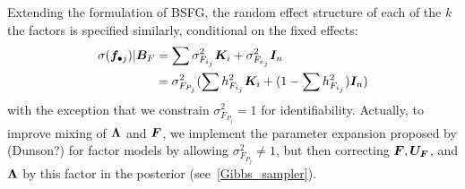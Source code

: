 \documentclass[11pt]{amsart}
\newcommand*{\B}[1]{\ifmmode\bm{#1}\else\textbf{#1}\fi}
\begin{document}
Extending the formulation of BSFG, the random effect structure of each of the $k$ the factors is specified similarly, conditional on the fixed effects:
\begin{align} \begin{split}
\sigma(\B{f}_{\bullet j} ) | \B{B}_F &= \sum \sigma^2_{F_{i_j}} \B{K}_i + \sigma^2_{F_{e_j}}\B{I}_n \\
&= \sigma^2_{F_{P_j}} (\sum h^2_{F_{i_j}} \B{K}_i + (1 - \sum h^2_{F_{i_j}})\B{I}_n) 
\end{split} \end{align}
\noindent with the exception that we constrain $\sigma^2_{F_{P_j}} = 1$ for identifiability. Actually, to improve mixing of $\B{\Lambda}$ and $\B{F}$, we implement the parameter expansion proposed by (Dunson?) for factor models by allowing $\sigma^2_{F_{P_j}} \neq1$, but then correcting $\B{F}, \B{U_F}$, and $\B{\Lambda}$ by this factor in the posterior (see~\ref{Gibbs_sampler}).
\end{document}
